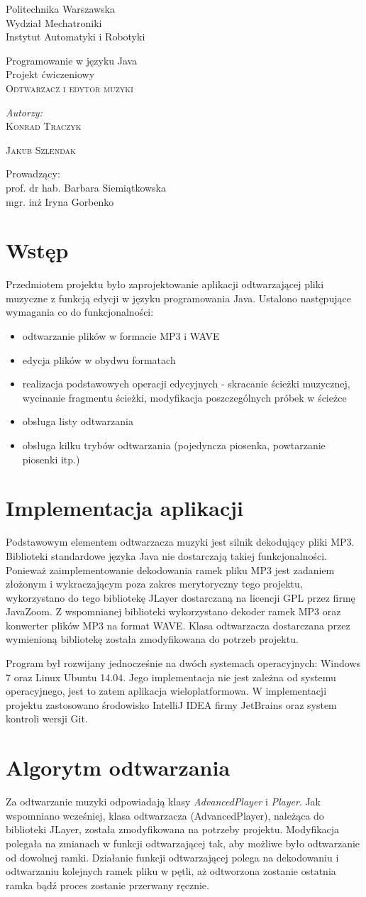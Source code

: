 \documentclass[12pt,a4paper,notitlepage]{article}
\makeatletter
\renewcommand{\maketitle}{\begin{titlepage}

    \vspace*{1cm}

    \begin{center}\small

   	 Politechnika Warszawska\\
    	Wydział Mechatroniki\\
 	Instytut Automatyki i Robotyki
    \end{center}
    \vspace{3cm}


    \begin{center}

	\small
	Programowanie w języku Java \\
	Projekt ćwiczeniowy \\
	
      \LARGE \textsc{Odtwarzacz i edytor muzyki}

         \end{center}


    \vspace{5.5cm}

    \begin{flushright}

    \begin{minipage}{5cm}

    \textit{\small Autorzy:}\\

    \normalsize \textsc{Konrad Traczyk} \par
    \normalsize \textsc{Jakub Szlendak} \par

    \end{minipage}

    \vspace{5cm}

     {\small Prowadzący:}\\
 
         {prof. dr hab. Barbara Siemiątkowska}\\	
         {mgr. inż Iryna Gorbenko}

     \end{flushright}

    \vspace*{\stretch{6}}

    \begin{center}

    \@date

    \end{center}

  \end{titlepage}%

}
\makeatother
\begin{document}
\maketitle

\section{Wstęp}
\label{sec:wstep}

Przedmiotem projektu było zaprojektowanie aplikacji odtwarzającej pliki muzyczne z funkcją edycji w języku programowania Java. Ustalono następujące wymagania co do funkcjonalności:
\begin{itemize}
 \item odtwarzanie plików w formacie MP3 i WAVE
 \item edycja plików w obydwu formatach
 \item realizacja podstawowych operacji edycyjnych - skracanie ścieżki muzycznej, wycinanie fragmentu ścieżki, modyfikacja poszczególnych próbek w ścieżce
 \item obsługa listy odtwarzania
 \item obsługa kilku trybów odtwarzania (pojedyncza piosenka, powtarzanie piosenki itp.)
\end{itemize}

\section{Implementacja aplikacji}
\label{sec:implementacja}
Podstawowym elementem odtwarzacza muzyki jest silnik dekodujący pliki MP3. Biblioteki standardowe języka Java nie dostarczają takiej funkcjonalności.
Ponieważ zaimplementowanie dekodowania ramek pliku MP3 jest zadaniem złożonym i wykraczającym poza zakres merytoryczny tego projektu, wykorzystano do tego bibliotekę JLayer dostarczaną na licencji 
GPL przez firmę JavaZoom. Z wspomnianej biblioteki wykorzystano dekoder ramek MP3 oraz konwerter plików MP3 na format WAVE. Klasa odtwarzacza dostarczana przez wymienioną bibliotekę została zmodyfikowana do potrzeb projektu. 

Program był rozwijany jednocześnie na dwóch systemach operacyjnych: Windows 7 oraz Linux Ubuntu 14.04. Jego implementacja nie jest zależna od systemu operacyjnego, jest to zatem aplikacja wieloplatformowa. 
W implementacji projektu zastosowano środowisko IntelliJ IDEA firmy JetBrains oraz system kontroli wersji Git.
\section{Algorytm odtwarzania}
\label{sec:odtwarzanie}
Za odtwarzanie muzyki odpowiadają klasy \emph{AdvancedPlayer} i \emph{Player}.   
Jak wspomniano wcześniej, klasa odtwarzacza (AdvancedPlayer), należąca do biblioteki JLayer, została zmodyfikowana na potrzeby projektu. Modyfikacja polegała na zmianach w funkcji odtwarzającej tak, 
aby możliwe było odtwarzanie od dowolnej ramki. Działanie funkcji odtwarzającej polega na dekodowaniu i odtwarzaniu kolejnych ramek pliku w pętli, aż odtworzona zostanie ostatnia ramka
bądź proces zostanie przerwany ręcznie. 
\end{document}
